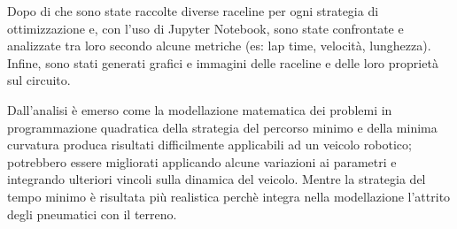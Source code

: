 \documentclass[12pt,a4paper]{article}
\begin{document}
Dopo di che sono state raccolte diverse raceline per ogni strategia di ottimizzazione e, con l'uso di
Jupyter Notebook, sono state confrontate e analizzate tra loro secondo alcune metriche (es: lap time,
velocità, lunghezza). Infine, sono stati generati grafici e immagini delle raceline e delle loro proprietà
sul circuito.

\bigskip
\noindent Dall'analisi è emerso come la modellazione matematica dei problemi in programmazione quadratica
della strategia del percorso minimo e della minima curvatura produca risultati difficilmente applicabili
ad un veicolo robotico; potrebbero essere migliorati applicando alcune variazioni ai parametri e
integrando ulteriori vincoli sulla dinamica del veicolo. Mentre la strategia del tempo minimo è risultata
più realistica perchè integra nella modellazione l'attrito degli pneumatici con il terreno.
\end{document}
